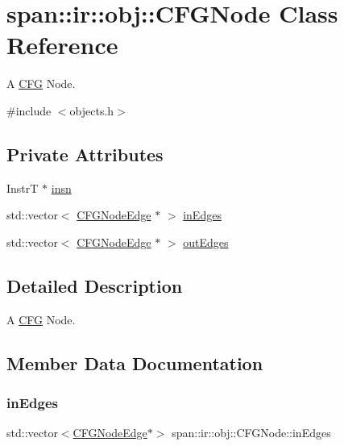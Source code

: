 \hypertarget{classspan_1_1ir_1_1obj_1_1CFGNode}{}\section{span\+:\+:ir\+:\+:obj\+:\+:C\+F\+G\+Node Class Reference}
\label{classspan_1_1ir_1_1obj_1_1CFGNode}


A \hyperlink{classspan_1_1ir_1_1obj_1_1CFG}{C\+FG} Node.  




{\ttfamily \#include $<$objects.\+h$>$}

\subsection*{Private Attributes}
\begin{DoxyCompactItemize}
\item 
InstrT $\ast$ \hyperlink{classspan_1_1ir_1_1obj_1_1CFGNode_a9b5037f569e7e6bcd38117009134a03b}{insn}
\item 
std\+::vector$<$ \hyperlink{classspan_1_1ir_1_1obj_1_1CFGNodeEdge}{C\+F\+G\+Node\+Edge} $\ast$ $>$ \hyperlink{classspan_1_1ir_1_1obj_1_1CFGNode_a8c47bc484535d940978469b85447b812}{in\+Edges}
\item 
std\+::vector$<$ \hyperlink{classspan_1_1ir_1_1obj_1_1CFGNodeEdge}{C\+F\+G\+Node\+Edge} $\ast$ $>$ \hyperlink{classspan_1_1ir_1_1obj_1_1CFGNode_afd6aa8d1ec4f152e752290d7f5c52dba}{out\+Edges}
\end{DoxyCompactItemize}


\subsection{Detailed Description}
A \hyperlink{classspan_1_1ir_1_1obj_1_1CFG}{C\+FG} Node. 

\subsection{Member Data Documentation}
\mbox{\label{classspan_1_1ir_1_1obj_1_1CFGNode_a8c47bc484535d940978469b85447b812}} 
\subsubsection{\texorpdfstring{in\+Edges}{inEdges}}
{\footnotesize\ttfamily std\+::vector$<$\hyperlink{classspan_1_1ir_1_1obj_1_1CFGNodeEdge}{C\+F\+G\+Node\+Edge}$\ast$$>$ span\+::ir\+::obj\+::\+C\+F\+G\+Node\+::in\+Edges\hspace{0.3cm}{\ttfamily [private]}}

